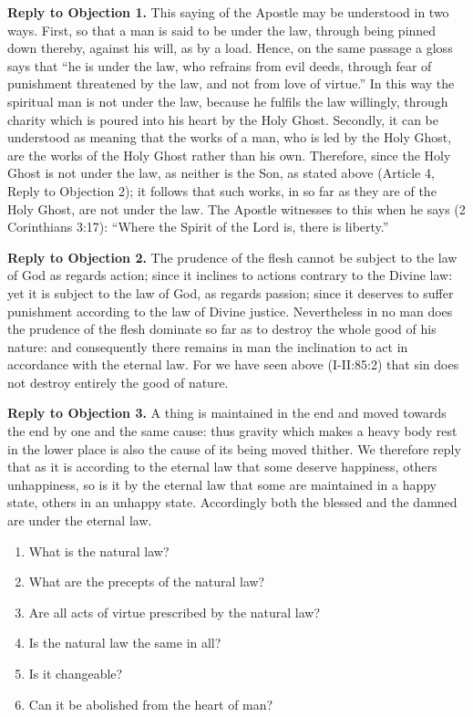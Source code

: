 \textbf{Reply to Objection 1.} This saying of the Apostle may be understood in two ways. First, so that a man is said to be under the law, through being pinned down thereby, against his will, as by a load. Hence, on the same passage a gloss says that ``he is under the law, who refrains from evil deeds, through fear of punishment threatened by the law, and not from love of virtue.'' In this way the spiritual man is not under the law, because he fulfils the law willingly, through charity which is poured into his heart by the Holy Ghost. Secondly, it can be understood as meaning that the works of a man, who is led by the Holy Ghost, are the works of the Holy Ghost rather than his own. Therefore, since the Holy Ghost is not under the law, as neither is the Son, as stated above (Article 4, Reply to Objection 2); it follows that such works, in so far as they are of the Holy Ghost, are not under the law. The Apostle witnesses to this when he says (2 Corinthians 3:17): ``Where the Spirit of the Lord is, there is liberty.''

\textbf{Reply to Objection 2.} The prudence of the flesh cannot be subject to the law of God as regards action; since it inclines to actions contrary to the Divine law: yet it is subject to the law of God, as regards passion; since it deserves to suffer punishment according to the law of Divine justice. Nevertheless in no man does the prudence of the flesh dominate so far as to destroy the whole good of his nature: and consequently there remains in man the inclination to act in accordance with the eternal law. For we have seen above (I-II:85:2) that sin does not destroy entirely the good of nature.

\textbf{Reply to Objection 3.} A thing is maintained in the end and moved towards the end by one and the same cause: thus gravity which makes a heavy body rest in the lower place is also the cause of its being moved thither. We therefore reply that as it is according to the eternal law that some deserve happiness, others unhappiness, so is it by the eternal law that some are maintained in a happy state, others in an unhappy state. Accordingly both the blessed and the damned are under the eternal law.




\begin{enumerate}

\item  What is the natural law? 
\item  What are the precepts of the natural law? 
\item  Are all acts of virtue prescribed by the natural law? 
\item  Is the natural law the same in all? 
\item  Is it changeable? 
\item  Can it be abolished from the heart of man? 
\end{enumerate}

